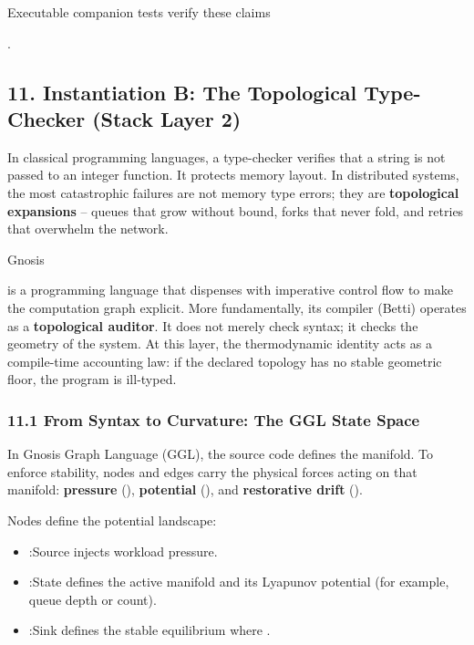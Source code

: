 \documentclass[
]{article}
\providecommand{\tightlist}{%
  \setlength{\itemsep}{0pt}\setlength{\parskip}{0pt}}
\begin{document}
Executable companion tests verify these claims

.

\subsection{\texorpdfstring{\textbf{11. Instantiation B: The Topological
Type-Checker (Stack Layer
2)}}{11. Instantiation B: The Topological Type-Checker (Stack Layer 2)}}\label{instantiation-b-the-topological-type-checker-stack-layer-2}

In classical programming languages, a type-checker verifies that a
string is not passed to an integer function. It protects memory layout.
In distributed systems, the most catastrophic failures are not memory
type errors; they are \textbf{topological expansions} -- queues that
grow without bound, forks that never fold, and retries that overwhelm
the network.

Gnosis

is a programming language that dispenses with imperative control flow to
make the computation graph explicit. More fundamentally, its compiler
(Betti) operates as a \textbf{topological auditor}. It does not merely
check syntax; it checks the geometry of the system. At this layer, the
thermodynamic identity acts as a compile-time accounting law: if the
declared topology has no stable geometric floor, the program is
ill-typed.

\subsubsection{\texorpdfstring{\textbf{11.1 From Syntax to Curvature:
The GGL State
Space}}{11.1 From Syntax to Curvature: The GGL State Space}}\label{from-syntax-to-curvature-the-ggl-state-space}

In Gnosis Graph Language (GGL), the source code defines the manifold. To
enforce stability, nodes and edges carry the physical forces acting on
that manifold: \textbf{pressure} (), \textbf{potential} (), and
\textbf{restorative drift} ().

Nodes define the potential landscape:

\begin{itemize}
\tightlist
\item
  :Source injects workload pressure.\\
\item
  :State defines the active manifold and its Lyapunov potential (for
  example, queue depth or count).\\
\item
  :Sink defines the stable equilibrium where .
\end{itemize}
\end{document}
